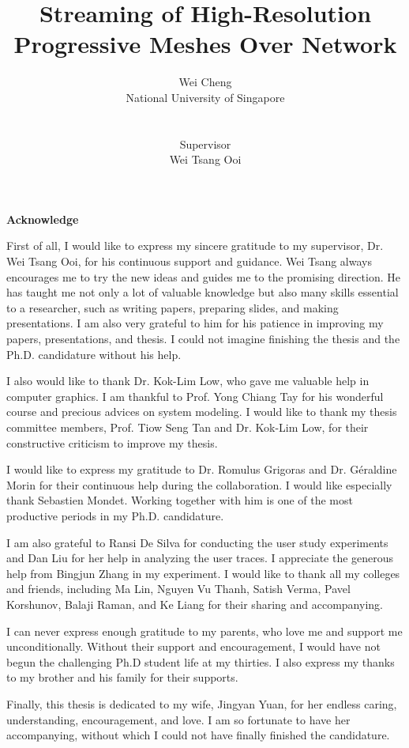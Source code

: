 \documentclass[11pt, a4paper]{report}
\title{Streaming of High-Resolution Progressive Meshes Over Network}
\author{Wei Cheng\\
National University of Singapore\\
\\
\\
Supervisor\\
Wei Tsang Ooi}
\newcommand\acknowledgename{Acknowledge}
\newenvironment{acknowledge}%
    {\cleardoublepage \null \vfill
    \begin{center}%
         \bfseries \acknowledgename
    \end{center}}%
    {\vfill \null}
\begin{document}
\maketitle
\doublespacing
{}
   
\begin{acknowledge}
    First of all, I would like to express my sincere gratitude to my supervisor, Dr. Wei Tsang Ooi, for his continuous support and guidance. 
    Wei Tsang always encourages me to try the new ideas and guides me to the promising direction. He has taught me not only a lot of valuable knowledge
    but also many skills essential to a researcher, such as writing papers, preparing slides, and making presentations. 
    I am also very grateful to him for his patience in improving my papers, presentations, and thesis. 
    I could not imagine finishing the thesis and the Ph.D. candidature without his help.

    I also would like to thank Dr. Kok-Lim Low, who gave me valuable help in computer graphics. I am thankful to Prof. Yong Chiang Tay for his
    wonderful course and precious advices on system modeling. I would like to thank my thesis committee members, Prof. Tiow Seng Tan and Dr. Kok-Lim Low, 
    for their constructive criticism to improve my thesis.

    I would like to express my gratitude to Dr. Romulus Grigoras and Dr. G\'{e}raldine Morin for their continuous help during the collaboration. I would
    like especially thank Sebastien Mondet. Working together with him is one of the most productive periods in my Ph.D. candidature. 

    I am also grateful to Ransi De Silva for conducting the user study experiments and Dan Liu for her help in analyzing the user traces.
    I appreciate the generous help from Bingjun Zhang in my experiment. 
    I would like to thank all my colleges and friends, including Ma Lin, Nguyen Vu Thanh, Satish Verma, Pavel Korshunov, Balaji Raman, and Ke Liang for their
    sharing and accompanying.

    I can never express enough gratitude to my parents, who love me and support me unconditionally. Without their support and encouragement, I would have not
    begun the challenging Ph.D student life at my thirties. I also express my thanks to my brother and his family for their supports. 
    
    Finally, this thesis is dedicated to my wife, Jingyan Yuan, for her endless caring, understanding, encouragement, and love. I am so fortunate to have her
    accompanying, without which I could not have finally finished the candidature.

\end{acknowledge}
\tableofcontents
\listoffigures
\listoftables







\appendix
\end{document}
